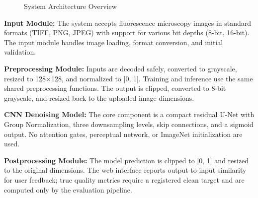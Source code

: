 \documentclass[12pt,a4paper]{report}
\begin{document}
\begin{figure}[H]
\centering
{}
\caption{System Architecture Overview}
\label{fig:architecture}
\end{figure}

\textbf{Input Module:} The system accepts fluorescence microscopy images in standard formats (TIFF, PNG, JPEG) with support for various bit depths (8-bit, 16-bit). The input module handles image loading, format conversion, and initial validation.

\vspace{0.5cm}

\textbf{Preprocessing Module:} Inputs are decoded safely, converted to grayscale, resized to 128$\times$128, and normalized to [0, 1]. Training and inference use the same shared preprocessing functions. The output is clipped, converted to 8-bit grayscale, and resized back to the uploaded image dimensions.

\vspace{0.5cm}

\textbf{CNN Denoising Model:} The core component is a compact residual U-Net with Group Normalization, three downsampling levels, skip connections, and a sigmoid output. No attention gates, perceptual network, or ImageNet initialization are used.

\vspace{0.5cm}

\textbf{Postprocessing Module:} The model prediction is clipped to [0, 1] and resized to the original dimensions. The web interface reports output-to-input similarity for user feedback; true quality metrics require a registered clean target and are computed only by the evaluation pipeline.
\end{document}
